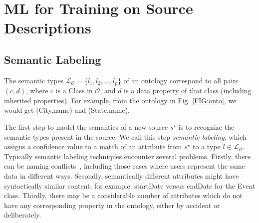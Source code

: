 \documentclass[letterpaper]{article} %
\newcommand{\authornote}[3]{
  {\fbox{\sc 
  #1}:$\blacktriangleright$\textcolor{#2}{\small{#3}}$\blacktriangleleft$}%
}
\newcommand{\ddg}[1]{\authornote{DDG}{blue}{#1}}
\begin{document}
\section{ML for Training on Source Descriptions \label{SEC:ML}}


\subsection{Semantic Labeling}
The semantic types $\mathcal{L_O} = \{l_1, l_2, ..., l_p\}$ of an ontology 
correspond to all pairs $(c,d)$, where $c$ is a Class in $\mathcal{O}$, and $d$ 
is a data property of that class (including inherited properties). 
For example, from the ontology in Fig. \ref{FIG:onto}, we would get
(City,name) and (State,name).

The first step to model the semantics of a new source $s^\star$ is to recognize the semantic types present in the source. 
We call this step \emph{semantic labeling}, which assigns a confidence value to a match of an attribute from $s^\star$ to a type $l \in 
\mathcal{L_O}$.
Typically semantic labeling techniques encounter several problems.
Firstly, there can be naming conflicts~\cite{Pinkel:rodi}, including those 
cases where users represent the same data in different ways.
Secondly, semantically different attributes might have syntactically similar 
content, for example, startDate versus endDate for the Event class.
Thirdly, there may be a considerable number of attributes which do not have any 
corresponding property in the ontology, either by accident or deliberately.
\end{document}
